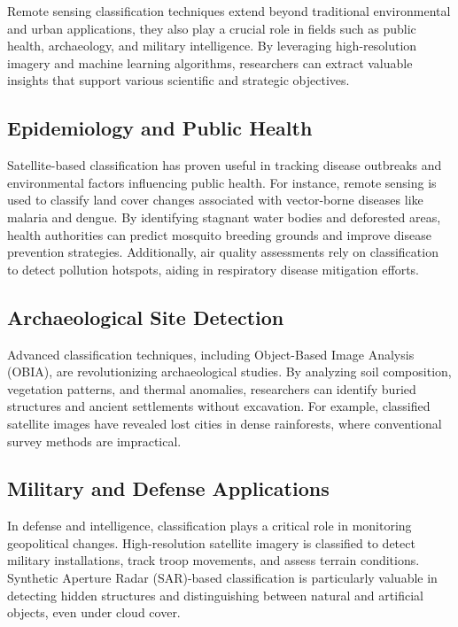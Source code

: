 \documentclass[
  letterpaper,
]{scrbook}
\begin{document}
Remote sensing classification techniques extend beyond traditional
environmental and urban applications, they also play a crucial role in
fields such as public health, archaeology, and military intelligence. By
leveraging high-resolution imagery and machine learning algorithms,
researchers can extract valuable insights that support various
scientific and strategic objectives.

\subsection{\texorpdfstring{\textbf{Epidemiology and Public
Health}}{Epidemiology and Public Health}}\label{epidemiology-and-public-health}

Satellite-based classification has proven useful in tracking disease
outbreaks and environmental factors influencing public health. For
instance, remote sensing is used to classify land cover changes
associated with vector-borne diseases like malaria and dengue. By
identifying stagnant water bodies and deforested areas, health
authorities can predict mosquito breeding grounds and improve disease
prevention strategies. Additionally, air quality assessments rely on
classification to detect pollution hotspots, aiding in respiratory
disease mitigation efforts.

\subsection{\texorpdfstring{\textbf{Archaeological Site
Detection}}{Archaeological Site Detection}}\label{archaeological-site-detection}

Advanced classification techniques, including Object-Based Image
Analysis (OBIA), are revolutionizing archaeological studies. By
analyzing soil composition, vegetation patterns, and thermal anomalies,
researchers can identify buried structures and ancient settlements
without excavation. For example, classified satellite images have
revealed lost cities in dense rainforests, where conventional survey
methods are impractical.

\subsection{\texorpdfstring{\textbf{Military and Defense
Applications}}{Military and Defense Applications}}\label{military-and-defense-applications}

In defense and intelligence, classification plays a critical role in
monitoring geopolitical changes. High-resolution satellite imagery is
classified to detect military installations, track troop movements, and
assess terrain conditions. Synthetic Aperture Radar (SAR)-based
classification is particularly valuable in detecting hidden structures
and distinguishing between natural and artificial objects, even under
cloud cover.
\end{document}
